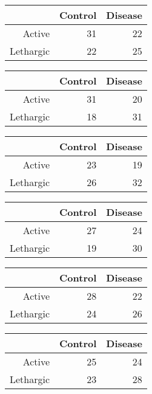\documentclass{article}\usepackage{graphicx, color}
\begin{document}
\begin{multicols}{3}
\bigskip
\begin{tabular}{rrr}
  \hline
 & Control & Disease \\ 
  \hline
Active &  31 &  22 \\ 
  Lethargic &  22 &  25 \\ 
   \hline
\end{tabular}


\bigskip
\begin{tabular}{rrr}
  \hline
 & Control & Disease \\ 
  \hline
Active &  31 &  20 \\ 
  Lethargic &  18 &  31 \\ 
   \hline
\end{tabular}


\bigskip
\begin{tabular}{rrr}
  \hline
 & Control & Disease \\ 
  \hline
Active &  23 &  19 \\ 
  Lethargic &  26 &  32 \\ 
   \hline
\end{tabular}


\bigskip
\begin{tabular}{rrr}
  \hline
 & Control & Disease \\ 
  \hline
Active &  27 &  24 \\ 
  Lethargic &  19 &  30 \\ 
   \hline
\end{tabular}


\bigskip
\begin{tabular}{rrr}
  \hline
 & Control & Disease \\ 
  \hline
Active &  28 &  22 \\ 
  Lethargic &  24 &  26 \\ 
   \hline
\end{tabular}


\bigskip
\begin{tabular}{rrr}
  \hline
 & Control & Disease \\ 
  \hline
Active &  25 &  24 \\ 
  Lethargic &  23 &  28 \\ 
   \hline
\end{tabular}



\end{multicols}
\end{document}
